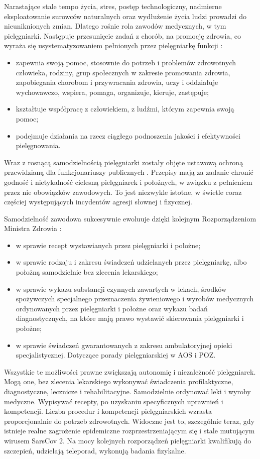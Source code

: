 \documentclass[a4paper,12pt,twoside,openany]{report}
\begin{document}
Narastające stale tempo życia, stres, postęp technologiczny, nadmierne eksploatowanie surowców naturalnych oraz wydłużenie życia ludzi prowadzi do nieuniknionych zmian. Dlatego rośnie rola zawodów medycznych, w tym pielęgniarki. Następuje przesunięcie zadań z chorób, na promocję zdrowia, co wyraża się usystematyzowaniem pełnionych przez pielęgniarkę funkcji :
\begin{itemize}
	\item zapewnia swoją pomoc, stosownie do potrzeb i problemów zdrowotnych człowieka, rodziny, grup społecznych w zakresie promowania zdrowia, zapobiegania chorobom i przywracania zdrowia, uczy i oddziałuje wychowawczo, wspiera, pomaga, organizuje, kieruje, zastępuje;
	\item kształtuje współpracę z człowiekiem, z ludźmi, którym zapewnia swoją pomoc;
	\item podejmuje działania na rzecz ciągłego podnoszenia jakości i efektywności pielęgnowania.
\end{itemize}

Wraz z rosnącą samodzielnością pielęgniarki zostały objęte ustawową ochroną przewidzianą dla funkcjonariuszy publicznych \cite{prawo}. Przepisy mają za zadanie chronić godność i nietykalność cielesną pielęgniarek i położnych, w związku z pełnieniem przez nie obowiązków zawodowych. To jest niezwykle istotne, w świetle coraz częściej występujących incydentów agresji słownej i fizycznej.

Samodzielność zawodowa sukcesywnie ewoluuje dzięki kolejnym Rozporządzeniom Ministra Zdrowia \cite{akty}:
\begin{itemize}
	\item w sprawie recept wystawianych przez pielęgniarki i położne;
	\item w sprawie rodzaju i zakresu świadczeń udzielanych przez pielęgniarkę, albo położną samodzielnie bez zlecenia lekarskiego;
	\item w sprawie wykazu substancji czynnych zawartych w lekach, środków spożywczych specjalnego przeznaczenia żywieniowego i wyrobów medycznych ordynowanych przez pielęgniarki i położne oraz wykazu badań diagnostycznych, na które mają prawo wystawić skierowania pielęgniarki i położne;
	\item w sprawie świadczeń gwarantowanych z zakresu ambulatoryjnej opieki specjalistycznej. Dotyczące porady pielęgniarskiej w AOS i POZ.
\end{itemize}

Wszystkie te możliwości prawne zwiększają autonomię i niezależność pielęgniarek. Mogą one, bez zlecenia lekarskiego wykonywać świadczenia profilaktyczne, diagnostyczne, lecznicze i rehabilitacyjne. Samodzielnie ordynować leki i wyroby medyczne. Wypisywać recepty, po uzyskaniu specyficznych uprawnień i kompetencji. Liczba procedur i kompetencji pielęgniarskich wzrasta proporcjonalnie do potrzeb zdrowotnych. Widoczne jest to, szczególnie teraz, gdy istnieje realne zagrożenie epidemiczne rozprzestrzeniającym się i stale mutującym wirusem SarsCov 2. Na mocy kolejnych rozporządzeń pielęgniarki kwalifikują do szczepień, udzielają teleporad, wykonują badania fizykalne.
\end{document}
